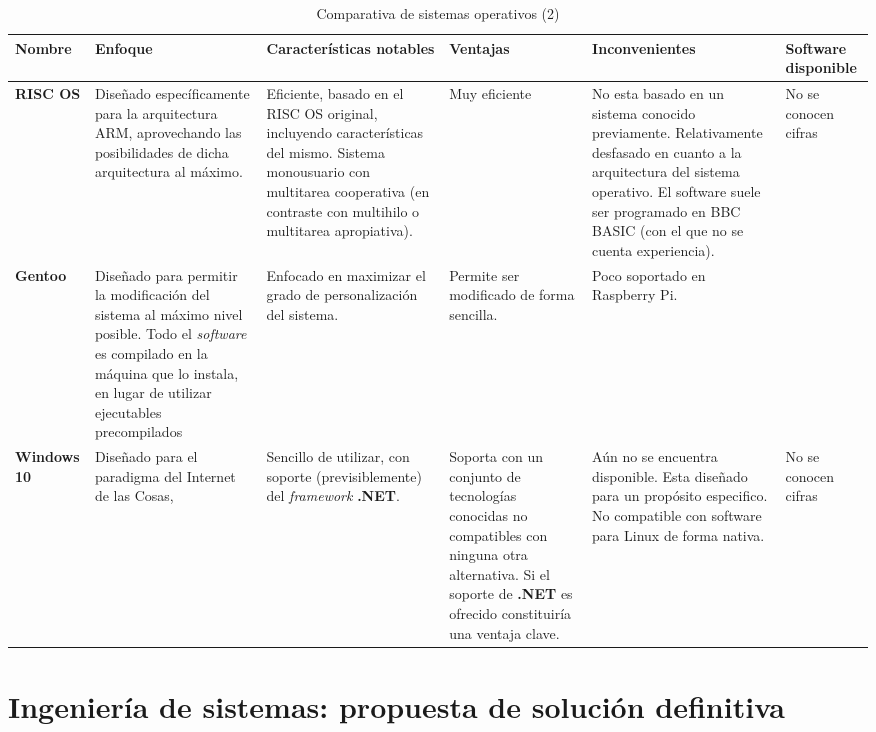 \begin{landscape}
\begin{table}[h]
\begin{tabular}{|p{2cm}|p{4cm}|p{5cm}|p{3cm}|p{4cm}|p{3.5cm}|}
\hline
\textbf{Nombre} & \textbf{Enfoque} & \textbf{Características notables} & \textbf{Ventajas} & \textbf{Inconvenientes} & \textbf{Software disponible}\\ \hline

\textbf{RISC OS} & Diseñado específicamente para la arquitectura ARM, aprovechando las posibilidades de dicha arquitectura al máximo. & Eficiente, basado en el RISC OS original, incluyendo características del mismo. Sistema monousuario con multitarea cooperativa (en contraste con multihilo o multitarea apropiativa). & Muy eficiente & No esta basado en un sistema conocido previamente. Relativamente desfasado en cuanto a la arquitectura del sistema operativo. El software suele ser programado en BBC BASIC (con el que no se cuenta experiencia). & No se conocen cifras\\ \hline

\textbf{Gentoo} & Diseñado para permitir la modificación del sistema al máximo nivel posible. Todo el \textit{software} es compilado en la máquina que lo instala, en lugar de utilizar ejecutables precompilados & Enfocado en maximizar el grado de personalización del sistema. & Permite ser modificado de forma sencilla. & Poco soportado en Raspberry Pi. & \\ \hline

\textbf{Windows 10} & Diseñado para el paradigma del Internet de las Cosas, & Sencillo de utilizar, con soporte (previsiblemente) del \textit{framework} \textbf{.NET}. & Soporta con un conjunto de tecnologías conocidas no compatibles con ninguna otra alternativa. Si el soporte de \textbf{.NET} es ofrecido constituiría una ventaja clave.  & Aún no se encuentra disponible\cite{windows10raspberry}. Esta diseñado para un propósito especifico. No compatible con software para Linux de forma nativa. & No se conocen cifras\\ \hline

\end{tabular}
\caption{Comparativa de sistemas operativos (2)}
\end{table}
\end{landscape}


\section{Ingeniería de sistemas: propuesta de solución definitiva}

